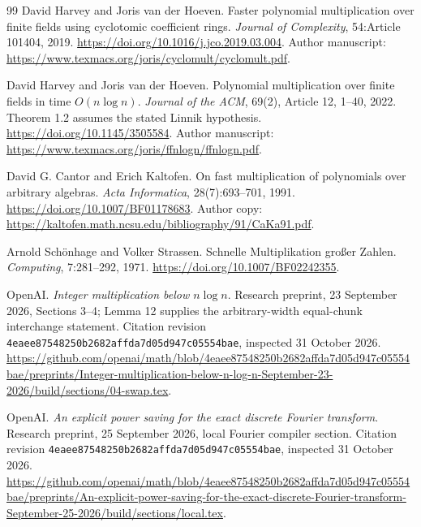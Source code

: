 \documentclass[11pt]{article}
\begin{document}
\appendix





\begin{thebibliography}{99}
David Harvey and Joris van der Hoeven.
\newblock Faster polynomial multiplication over finite fields using cyclotomic coefficient rings.
\newblock \emph{Journal of Complexity}, 54:Article 101404, 2019.
\newblock \url{https://doi.org/10.1016/j.jco.2019.03.004}.
\newblock Author manuscript: \url{https://www.texmacs.org/joris/cyclomult/cyclomult.pdf}.

David Harvey and Joris van der Hoeven.
\newblock Polynomial multiplication over finite fields in time $O(n\log n)$.
\newblock \emph{Journal of the ACM}, 69(2), Article 12, 1--40, 2022.
\newblock Theorem 1.2 assumes the stated Linnik hypothesis.
\newblock \url{https://doi.org/10.1145/3505584}.
\newblock Author manuscript: \url{https://www.texmacs.org/joris/ffnlogn/ffnlogn.pdf}.

David G. Cantor and Erich Kaltofen.
\newblock On fast multiplication of polynomials over arbitrary algebras.
\newblock \emph{Acta Informatica}, 28(7):693--701, 1991.
\newblock \url{https://doi.org/10.1007/BF01178683}.
\newblock Author copy: \url{https://kaltofen.math.ncsu.edu/bibliography/91/CaKa91.pdf}.

Arnold Sch\"onhage and Volker Strassen.
\newblock Schnelle Multiplikation gro{\ss}er Zahlen.
\newblock \emph{Computing}, 7:281--292, 1971.
\newblock \url{https://doi.org/10.1007/BF02242355}.

OpenAI.
\newblock \emph{Integer multiplication below $n\log n$}.
\newblock Research preprint, 23 September 2026, Sections 3--4;
Lemma 12 supplies the arbitrary-width equal-chunk interchange statement.
\newblock Citation revision \texttt{4eaee87548250b2682affda7d05d947c05554bae}, inspected 31 October 2026.
\newblock \url{https://github.com/openai/math/blob/4eaee87548250b2682affda7d05d947c05554bae/preprints/Integer-multiplication-below-n-log-n-September-23-2026/build/sections/04-swap.tex}.

OpenAI.
\newblock \emph{An explicit power saving for the exact discrete Fourier transform}.
\newblock Research preprint, 25 September 2026, local Fourier compiler section.
\newblock Citation revision \texttt{4eaee87548250b2682affda7d05d947c05554bae}, inspected 31 October 2026.
\newblock \url{https://github.com/openai/math/blob/4eaee87548250b2682affda7d05d947c05554bae/preprints/An-explicit-power-saving-for-the-exact-discrete-Fourier-transform-September-25-2026/build/sections/local.tex}.


\end{thebibliography}
\end{document}
